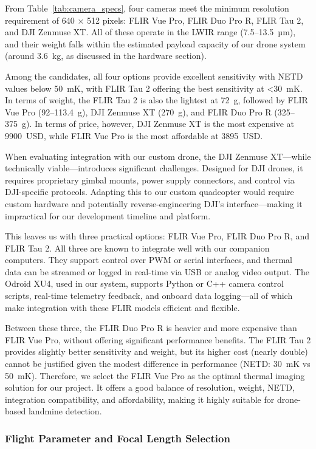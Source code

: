 From Table~\ref{tab:camera_specs}, four cameras meet the minimum resolution requirement of 640 × 512 pixels: FLIR Vue Pro, FLIR Duo Pro R, FLIR Tau 2, and DJI Zenmuse XT. All of these operate in the LWIR range (7.5–13.5~µm), and their weight falls within the estimated payload capacity of our drone system (around 3.6~kg, as discussed in the hardware section).

Among the candidates, all four options provide excellent sensitivity with NETD values below 50~mK, with FLIR Tau 2 offering the best sensitivity at <30~mK. In terms of weight, the FLIR Tau 2 is also the lightest at 72~g, followed by FLIR Vue Pro (92–113.4~g), DJI Zenmuse XT (270~g), and FLIR Duo Pro R (325–375~g). In terms of price, however, DJI Zenmuse XT is the most expensive at 9900~USD, while FLIR Vue Pro is the most affordable at 3895~USD.

When evaluating integration with our custom drone, the DJI Zenmuse XT—while technically viable—introduces significant challenges. Designed for DJI drones, it requires proprietary gimbal mounts, power supply connectors, and control via DJI-specific protocols. Adapting this to our custom quadcopter would require custom hardware and potentially reverse-engineering DJI’s interface—making it impractical for our development timeline and platform.

This leaves us with three practical options: FLIR Vue Pro, FLIR Duo Pro R, and FLIR Tau 2. All three are known to integrate well with our companion computers. They support control over PWM or serial interfaces, and thermal data can be streamed or logged in real-time via USB or analog video output. The Odroid XU4, used in our system, supports Python or C++ camera control scripts, real-time telemetry feedback, and onboard data logging—all of which make integration with these FLIR models efficient and flexible.

Between these three, the FLIR Duo Pro R is heavier and more expensive than FLIR Vue Pro, without offering significant performance benefits. The FLIR Tau 2 provides slightly better sensitivity and weight, but its higher cost (nearly double) cannot be justified given the modest difference in performance (NETD: 30~mK vs 50~mK). Therefore, we select the FLIR Vue Pro as the optimal thermal imaging solution for our project. It offers a good balance of resolution, weight, NETD, integration compatibility, and affordability, making it highly suitable for drone-based landmine detection.


\subsubsection{Flight Parameter and Focal Length Selection}

